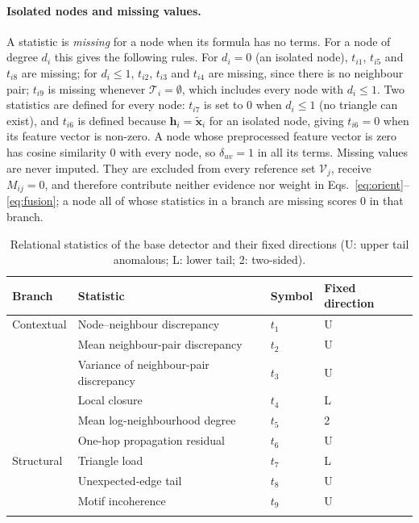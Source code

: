\documentclass[pdflatex,sn-mathphys-ay]{sn-jnl}
\theoremstyle{plain}
\theoremstyle{remark}
\begin{document}
\paragraph{Isolated nodes and missing values.} A statistic is \emph{missing} for a node when its formula has no terms. For a node of degree $d_i$ this gives the following rules. For $d_i=0$ (an isolated node), $t_{i1}$, $t_{i5}$ and $t_{i8}$ are missing; for $d_i\le1$, $t_{i2}$, $t_{i3}$ and $t_{i4}$ are missing, since there is no neighbour pair; $t_{i9}$ is missing whenever $\mathcal{T}_i=\emptyset$, which includes every node with $d_i\le1$. Two statistics are defined for every node: $t_{i7}$ is set to $0$ when $d_i\le1$ (no triangle can exist), and $t_{i6}$ is defined because $\mathbf{h}_i=\tilde{\mathbf{x}}_i$ for an isolated node, giving $t_{i6}=0$ when its feature vector is non-zero. A node whose preprocessed feature vector is zero has cosine similarity $0$ with every node, so $\delta_{uv}=1$ in all its terms. Missing values are never imputed. They are excluded from every reference set $\mathcal{V}_j$, receive $M_{ij}=0$, and therefore contribute neither evidence nor weight in Eqs.~\eqref{eq:orient}--\eqref{eq:fusion}; a node all of whose statistics in a branch are missing scores 0 in that branch.

\begin{table}[!ht]
\caption{Relational statistics of the base detector and their fixed directions (U: upper tail anomalous; L: lower tail; 2: two-sided).}
\label{tab:stats}
\footnotesize
\begin{tabular}{@{}llll@{}}
\toprule
Branch & Statistic & Symbol & Fixed direction \\
\midrule
Contextual & Node--neighbour discrepancy & $t_1$ & U \\
 & Mean neighbour-pair discrepancy & $t_2$ & U \\
 & Variance of neighbour-pair discrepancy & $t_3$ & U \\
 & Local closure & $t_4$ & L \\
 & Mean log-neighbourhood degree & $t_5$ & 2 \\
 & One-hop propagation residual & $t_6$ & U \\
\midrule
Structural & Triangle load & $t_7$ & L \\
 & Unexpected-edge tail & $t_8$ & U \\
 & Motif incoherence & $t_9$ & U \\
\botrule
\end{tabular}
\end{table}
\end{document}
